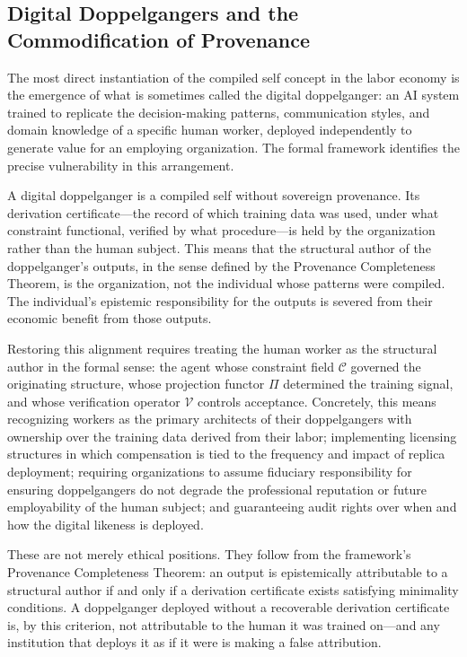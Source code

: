 \documentclass[12pt, a4paper]{article}
\theoremstyle{plain}
\theoremstyle{definition}
\theoremstyle{remark}
\begin{document}
\subsection{Digital Doppelgangers and the Commodification of Provenance}

The most direct instantiation of the compiled self concept in the labor economy is the emergence of what is sometimes called the digital doppelganger: an AI system trained to replicate the decision-making patterns, communication styles, and domain knowledge of a specific human worker, deployed independently to generate value for an employing organization. The formal framework identifies the precise vulnerability in this arrangement.

A digital doppelganger is a compiled self without sovereign provenance. Its derivation certificate---the record of which training data was used, under what constraint functional, verified by what procedure---is held by the organization rather than the human subject. This means that the structural author of the doppelganger's outputs, in the sense defined by the Provenance Completeness Theorem, is the organization, not the individual whose patterns were compiled. The individual's epistemic responsibility for the outputs is severed from their economic benefit from those outputs.

Restoring this alignment requires treating the human worker as the structural author in the formal sense: the agent whose constraint field $\mathcal{C}$ governed the originating structure, whose projection functor $\Pi$ determined the training signal, and whose verification operator $\mathcal{V}$ controls acceptance. Concretely, this means recognizing workers as the primary architects of their doppelgangers with ownership over the training data derived from their labor; implementing licensing structures in which compensation is tied to the frequency and impact of replica deployment; requiring organizations to assume fiduciary responsibility for ensuring doppelgangers do not degrade the professional reputation or future employability of the human subject; and guaranteeing audit rights over when and how the digital likeness is deployed.

These are not merely ethical positions. They follow from the framework's Provenance Completeness Theorem: an output is epistemically attributable to a structural author if and only if a derivation certificate exists satisfying minimality conditions. A doppelganger deployed without a recoverable derivation certificate is, by this criterion, not attributable to the human it was trained on---and any institution that deploys it as if it were is making a false attribution.
\end{document}
